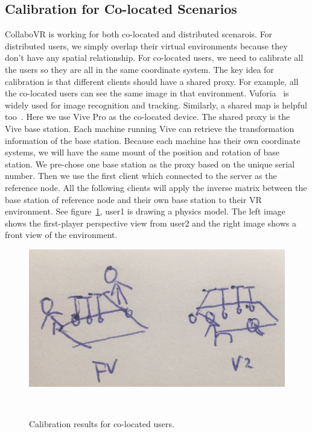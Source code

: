 \documentclass{sigchi}
\begin{document}
\subsection{Calibration for Co-located Scenarios}
CollaboVR is working for both co-located and distributed scenarois. For distributed users, we simply overlap their virtual environments because they don't have any spatial relationship. For co-located users, we need to calibrate all the users so they are all in the same coordinate system. The key idea for calibration is that different clients should have a shared proxy. For example, all the co-located users can see the same image in that environment. Vuforia~\cite{Vuforia} is widely used for image recognition and tracking. Similarly, a shared map is helpful too~\cite{Hololens}. Here we use Vive Pro as the co-located device. The shared proxy is the Vive base station. Each machine running Vive can retrieve the transformation information of the base station. Because each machine has their own coordinate systems, we will have the same mount of the position and rotation of base station. We pre-chose one base station as the proxy based on the unique serial number. Then we use the first client which connected to the server as the reference node. All the following clients will apply the inverse matrix between the base station of reference node and their own base station to their VR environment. See figure~\ref{fig:vivepro}, user1 is drawing a physics model. The left image shows the first-player perspective view from user2 and the right image shows a front view of the environment.

\begin{figure}[tb!]
 \centering
 \includegraphics[width=0.9\columnwidth]{vivepro.jpg}
 \caption{Calibration results for co-located users.
 }~\label{fig:vivepro}
\end{figure}
\end{document}
